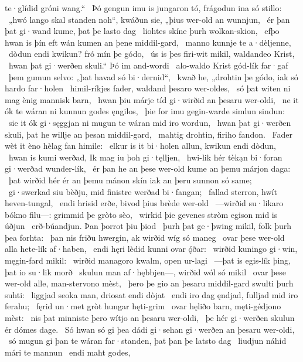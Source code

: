 te·glídid gróni wang.“ \hld\ Þó gengun imu is jungaron tó,
frágodun ina só stillo: \hld\ „hwó lango skal standen noh“, kwáðun sie,
„þius wer-old an wunnjun, \hld\ ér þan þat gi·wand kume,
þat þe lasto dag \hld\ liohtes skíne
þurh wolkan-skion, \hld\ efþo hwan is þín eft wán kumen
an þene middil-gard, \hld\ manno kunnje
te a·dèljenne, \hld\ dòdun endi kwikun?
fró mín þe gódo, \hld\ ús is þes firi-wit mikil,
waldandeo Krist, \hld\ hwan þat gi·werðen skuli.“
Þó im and-wordi \hld\ alo-waldo Krist
gód-lík far·gaf \hld\ þem gumun selvo:
„þat havad só bi·dernid“, \hld\ kwað he, „drohtin þe gódo,
iak só hardo far·holen \hld\ himil-ríkjes fader,
waldand þesaro wer-oldes, \hld\ só þat witen ni mag
ènig mannisk barn, \hld\ hwan þiu márje tíd
gi·wirðid an þesaru wer-oldi, \hld\ ne it ók te wáran ni kunnun
godes ęngilos, \hld\ þie for imu gegin-warde
simlun sindun: \hld\ sie it ók gi·sęggjan ni mugun
te wáran mid iro wordun, \hld\ hwan þat gi·werðen skuli,
þat he willje an þesan middil-gard, \hld\ mahtig drohtin,
firiho fandon. \hld\ Fader wèt it èno
hèlag fan himile: \hld\ elkur is it bi·holen allun,
kwikun endi dòdun, \hld\ hwan is kumi werðad,
Ik mag iu þoh gi·tęlljen, \hld\ hwi-lik hér tèkạn bi·foran
gi·werðad wunder-lík, \hld\ ér þan he an þese wer-old kume
an þemu márjon daga: \hld\ þat wirðid hér ér an þemu mánon skín
iak an þeru sunnon só same; \hld\ gi·swerkad siu bèðju,
mid finistre werðad bi·fangan; \hld\ fallad sterron,
hwít heven-tungal, \hld\ endi hrisid erðe,
bivod þius brède wer-old \hld\ —wirðid su·likaro bókno filu—:
grimmid þe gròto sèo, \hld\ wirkid þie gevenes stròm
egison mid is úðjun \hld\ erð-búandjun.
Þan þorrot þiu þiod \hld\ þurh þat ge·þwing mikil,
folk þurh þea forhta: \hld\ þan nis friðu hwergin,
ak wirðid wíg só maneg \hld\ ovar þese wer-old alla
hete-lík af·haben, \hld\ endi hęri lèdid
kunni ovar ǫ́ðar: \hld\ wirðid kuningo gi·win,
męgin-fard mikil: \hld\ wirðid managoro kwalm,
open ur-lagi \hld\ —þat is egis-lík þing,
þat io su·lik morð \hld\ skulun man af·hębbjen—,
wirðid wól só mikil \hld\ ovar þese wer-old alle,
man-stervono mèst, \hld\ þero þe gio an þesaru middil-gard
swulti þurh suhti: \hld\ liggjad seoka man,
driosat endi dòjat \hld\ endi iro dag ęndjad,
fulljad mid iro ferahu; \hld\ fęrid un·met gròt
hungar hęti-grim \hld\ ovar hęliðo barn,
męti-gédjono mèst: \hld\ nis þat minniste
þero wítjo an þesaru wer-oldi, \hld\ þe hér gi·werðen skulun
ér dómes dage. \hld\ Só hwan só gi þea dádi gi·sehan
gi·werðen an þesaru wer-oldi, \hld\ só mugun gi þan te wáran far·standen,
þat þan þe latsto dag \hld\ liudjun náhid
mári te mannun \hld\ endi maht godes,
